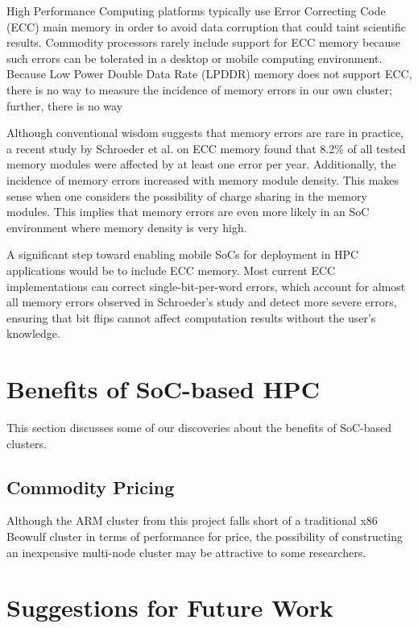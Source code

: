 \documentclass[11pt]{book}
\begin{document}
High Performance Computing platforms typically use Error Correcting Code (ECC)
main memory in order to avoid data corruption that could taint scientific
results. Commodity processors rarely include support for ECC memory because such
errors can be tolerated in a desktop or mobile computing environment. Because
Low Power Double Data Rate (LPDDR) memory does not support ECC, there is no way
to measure the incidence of memory errors in our own cluster; further, there is
no way

Although conventional wisdom suggests that memory errors are rare in practice, a
recent study by Schroeder et al. \cite{schroeder-09} on ECC memory found that
8.2\% of all tested memory modules were affected by at least one error per
year. Additionally, the incidence of memory errors increased with memory module
density. This makes sense when one considers the possibility of charge sharing
in the memory modules. This implies that memory errors are even more likely in
an SoC environment where memory density is very high.

A significant step toward enabling mobile SoCs for deployment in HPC
applications would be to include ECC memory. Most current ECC implementations
can correct single-bit-per-word errors, which account for almost all memory
errors observed in Schroeder's study \cite{schroeder-09} and detect more severe
errors, ensuring that bit flips cannot affect computation results without the
user's knowledge.

\section{\textbf{Benefits of SoC-based HPC}}

This section discusses some of our discoveries about the benefits of SoC-based
clusters.

\subsection{\textbf{Commodity Pricing}}

Although the ARM cluster from this project falls short of a traditional x86
Beowulf cluster in terms of performance for price, the possibility of
constructing an inexpensive multi-node cluster may be attractive to some
researchers.

\section{\textbf{Suggestions for Future Work}}
\end{document}
